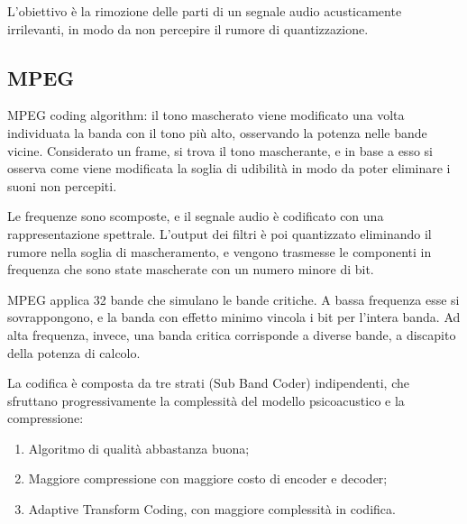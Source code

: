 L'obiettivo è la rimozione delle parti di un segnale audio acusticamente irrilevanti, in modo da non percepire il rumore di quantizzazione.

 \subsection{MPEG}
MPEG coding algorithm: il tono mascherato viene modificato una volta individuata la banda con il tono più alto, osservando la potenza nelle bande vicine. Considerato un frame, si trova il tono mascherante, e in base a esso si osserva come viene modificata la soglia di udibilità in modo da poter eliminare i suoni non percepiti. 

Le frequenze sono scomposte, e il segnale audio è codificato con una rappresentazione spettrale. L'output dei filtri è poi quantizzato eliminando il rumore nella soglia di mascheramento, e vengono trasmesse le componenti in frequenza che sono state mascherate con un numero minore di bit.

MPEG applica 32 bande che simulano le bande critiche. A bassa frequenza esse si sovrappongono, e la banda con effetto minimo vincola i bit per l'intera banda. Ad alta frequenza, invece, una banda critica corrisponde a diverse bande, a discapito della potenza di calcolo.

La codifica è composta da tre strati (Sub Band Coder) indipendenti, che sfruttano progressivamente la complessità del modello psicoacustico e la compressione: 
\begin{enumerate}
	\item Algoritmo di qualità abbastanza buona;
	\item Maggiore compressione con maggiore costo di encoder e decoder;
	\item Adaptive Transform Coding, con maggiore complessità in codifica.
\end{enumerate}





